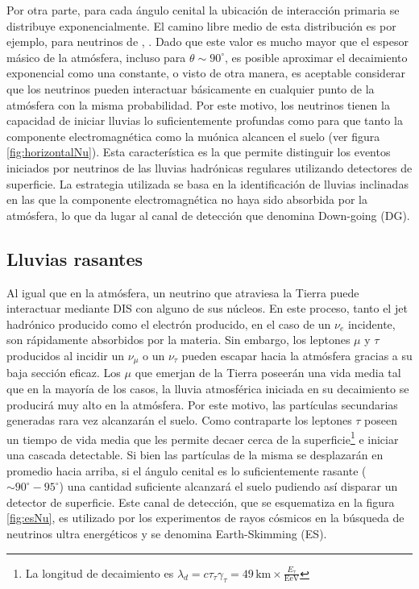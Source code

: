 Por otra parte, para cada \'angulo cenital la ubicaci\'on de interacci\'on primaria se distribuye exponencialmente.
El camino libre medio de esta distribuci\'on es por ejemplo, para neutrinos de , \cite{cite:Gandhi}. 
Dado que este valor es mucho mayor que el espesor m\'asico de la atmósfera, incluso para $\theta\sim90^\circ$, es posible aproximar el decaimiento exponencial como una constante, o visto de otra manera, es aceptable considerar que los neutrinos pueden interactuar básicamente en cualquier punto de la atmósfera con la misma probabilidad.
Por este motivo, los neutrinos tienen la capacidad de iniciar lluvias lo suficientemente profundas como para que tanto la componente electromagnética como la muónica alcancen el suelo (ver figura \ref{fig:horizontalNu}).
Esta caracter\'istica es la que permite distinguir los eventos iniciados por neutrinos de las lluvias hadr\'onicas regulares utilizando detectores de superficie.
La estrategia utilizada se basa en la identificaci\'on de lluvias inclinadas en las que la componente electromagnética no haya sido absorbida por la atmósfera, lo que da lugar al canal de detección que denomina Down-going (DG).

%
\subsection{Lluvias rasantes}
\label{sc:EStauInducedShowers}
%
Al igual que en la atm\'osfera, un neutrino que atraviesa la Tierra puede interactuar mediante DIS con alguno de sus n\'ucleos.
En este proceso, tanto el jet hadrónico producido como el electrón producido, en el caso de un $\nu_e$ incidente, son rápidamente absorbidos por la materia.
Sin embargo, los leptones $\mu$ y $\tau$ producidos al incidir un $\nu_{\mu}$ o un $\nu_{\tau}$ pueden escapar hacia la atm\'osfera gracias a su baja sección eficaz.
Los $\mu$ que emerjan de la Tierra poseerán una vida media tal que en la mayor\'ia de los casos, la lluvia atmosf\'erica iniciada en su decaimiento se producir\'a muy alto en la atmósfera.
Por este motivo, las partículas secundarias generadas rara vez alcanzarán el suelo.
Como contraparte los leptones $\tau$ poseen un tiempo de vida media que les permite decaer cerca de la superficie\footnote{La longitud de decaimiento es $\lambda_{d}=c\tau_{\tau}\gamma_{\tau}=49\,\text{km}\times\frac{E_{\tau}}{\text{EeV}}$} e iniciar una cascada detectable.
Si bien las part\'iculas de la misma se desplazar\'an en promedio hacia arriba, si el \'angulo cenital es lo suficientemente rasante ($\sim 90^\circ-95^\circ$) una cantidad suficiente alcanzar\'a el suelo pudiendo as\'i disparar un detector de superficie.
Este canal de detección, que se esquematiza en la figura \ref{fig:esNu}, es utilizado por los experimentos de rayos c\'osmicos en la b\'usqueda de neutrinos ultra energ\'eticos y se denomina Earth-Skimming (ES).

